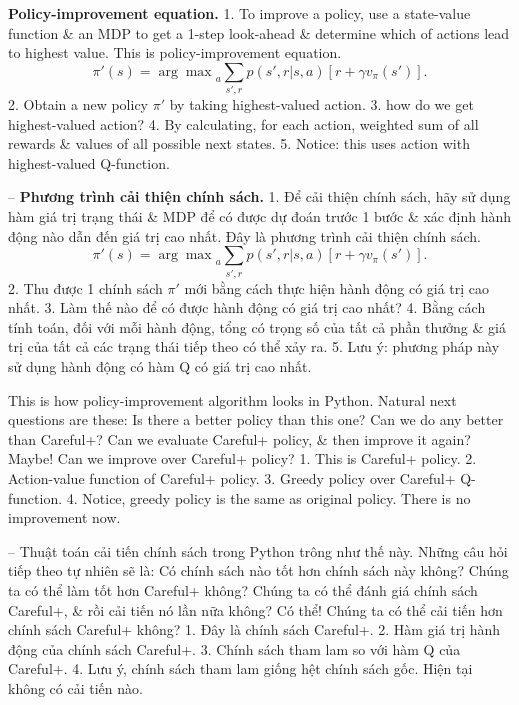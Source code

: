 \documentclass{article}
\begin{document}
\begin{itemize}
\begin{itemize}
\begin{itemize}
            {\bf Policy-improvement equation.} 1. To improve a policy, use a state-value function \& an MDP to get a 1-step look-ahead \& determine which of actions lead to highest value. This is policy-improvement equation.
            \begin{equation*}
                \pi'(s) = {\arg\max}_a\sum_{s',r} p(s',r|s,a)[r + \gamma v_\pi(s')].
            \end{equation*}
            2. Obtain a new policy $\pi'$ by taking highest-valued action. 3. how do we get highest-valued action? 4. By calculating, for each action, weighted sum of all rewards \& values of all possible next states. 5. Notice: this uses action with highest-valued Q-function.

            -- {\bf Phương trình cải thiện chính sách.} 1. Để cải thiện chính sách, hãy sử dụng hàm giá trị trạng thái \& MDP để có được dự đoán trước 1 bước \& xác định hành động nào dẫn đến giá trị cao nhất. Đây là phương trình cải thiện chính sách.
            \begin{equation*}
                \pi'(s) = {\arg\max}_a\sum_{s',r} p(s',r|s,a)[r + \gamma v_\pi(s')].
            \end{equation*}
            2. Thu được 1 chính sách $\pi'$ mới bằng cách thực hiện hành động có giá trị cao nhất. 3. Làm thế nào để có được hành động có giá trị cao nhất? 4. Bằng cách tính toán, đối với mỗi hành động, tổng có trọng số của tất cả phần thưởng \& giá trị của tất cả các trạng thái tiếp theo có thể xảy ra. 5. Lưu ý: phương pháp này sử dụng hành động có hàm Q có giá trị cao nhất.

            This is how policy-improvement algorithm looks in Python. Natural next questions are these: Is there a better policy than this one? Can we do any better than Careful+? Can we evaluate Careful+ policy, \& then improve it again? Maybe! {\sf Can we improve over Careful+ policy?} 1. This is Careful+ policy. 2. Action-value function of Careful+ policy. 3. Greedy policy over Careful+ Q-function. 4. Notice, greedy policy is the same as original policy. There is no improvement now.

            -- Thuật toán cải tiến chính sách trong Python trông như thế này. Những câu hỏi tiếp theo tự nhiên sẽ là: Có chính sách nào tốt hơn chính sách này không? Chúng ta có thể làm tốt hơn Careful+ không? Chúng ta có thể đánh giá chính sách Careful+, \& rồi cải tiến nó lần nữa không? Có thể! {\sf Chúng ta có thể cải tiến hơn chính sách Careful+ không?} 1. Đây là chính sách Careful+. 2. Hàm giá trị hành động của chính sách Careful+. 3. Chính sách tham lam so với hàm Q của Careful+. 4. Lưu ý, chính sách tham lam giống hệt chính sách gốc. Hiện tại không có cải tiến nào.


\end{itemize}
\end{itemize}
\end{itemize}
\end{document}
